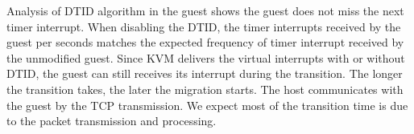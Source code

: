Analysis of DTID algorithm in the guest shows the
 guest does not miss the next timer interrupt.
When disabling the DTID, the timer interrupts received by the
guest per seconds matches the expected frequency of timer
interrupt received by the unmodified guest. Since KVM delivers
the virtual interrupts with or without DTID, the guest can
still receives its interrupt during the transition. The longer
the transition takes, the later the migration starts. The host
communicates with the guest by the TCP transmission. We expect
most of the transition time is due to the packet transmission
and processing. 
